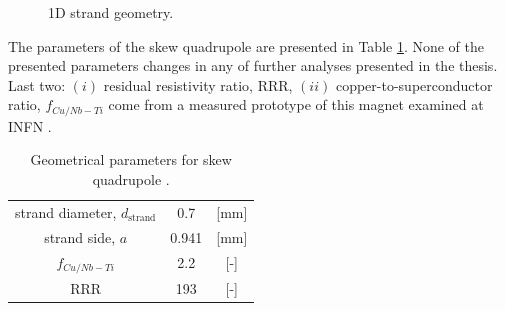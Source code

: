 \begin{figure}[H]
    \centering
    \caption{1D strand geometry.}
    \label{fig: 1d_strand_geometry}
\end{figure}

The parameters of the skew quadrupole are presented in Table \ref{table:skew_quad_params_table}. None of the presented parameters changes in any of further analyses presented in the thesis. Last two: $(i)$ residual resistivity ratio, RRR, $(ii)$ copper-to-superconductor ratio, $f_{Cu/Nb-Ti}$ come from a measured prototype of this magnet examined at INFN \cite{marco_prioli_mails}.

\begin{table}[h!]
    \caption{Geometrical parameters for skew quadrupole \cite{hl_lhc_tech_design_report_v01, marco_prioli_mails}.} 
    \vspace{-1.em} 
    \fontsize{10}{10}
    \selectfont 
    \renewcommand{\arraystretch}{1.5}
    \begin{center}
    \begin{tabular}{ ccc }  
    \hline
    strand diameter, $d_\text{strand}$ & 0.7 & [mm] \\
    strand side, $a$ & 0.941 & [mm] \\
    $f_{Cu/Nb-Ti}$ & 2.2 & [-] \\
    RRR & 193 & [-] \\  
    \hline 
    \end{tabular}
    \end{center}  
     \label{table:skew_quad_params_table} 
 \end{table}
